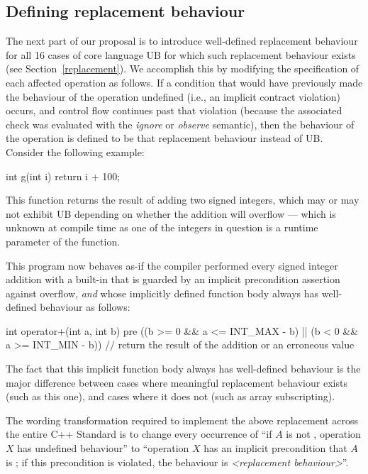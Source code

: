 \subsection{Defining replacement behaviour}
\label{specifyeb}
The next part of our proposal is to introduce well-defined replacement behaviour for all 16 cases of core language UB for which such replacement behaviour exists (see Section~\ref{replacement}). We accomplish this by modifying the specification of each affected operation as follows. If a condition that would have previously made the behaviour of the operation undefined (i.e., an implicit contract violation) occurs, and control flow continues past that violation (because the associated check was evaluated with the \emph{ignore} or \emph{observe} semantic), then the behaviour of the operation is defined to be that replacement behaviour instead of UB. Consider the following example:
\begin{codeblock}
int g(int i) {
  return i + 100;
}
\end{codeblock}
This function returns the result of adding two signed integers, which may or may not exhibit UB depending on whether the addition will overflow --- which is unknown at compile time as one of the integers in question is a runtime parameter of the function.

This program now behaves as-if the compiler performed every signed integer addition with a built-in  that is guarded by an implicit precondition assertion against overflow, \emph{and} whose implicitly defined function body always has well-defined behaviour as follows:
\begin{codeblock}
int operator+(int a, int b)
pre ((b >= 0 && a <= INT_MAX - b) || (b < 0 && a >= INT_MIN - b)) {  
  // return the result of the addition or an erroneous value
}
\end{codeblock}
The fact that this implicit function body always has well-defined behaviour is the major difference between cases where meaningful replacement behaviour exists (such as this one), and cases where it does not (such as array subscripting).

The wording transformation required to implement the above replacement across the entire C++ Standard is to change every occurrence of “if $A$ is not , operation $X$ has undefined behaviour'' to ``operation $X$ has an implicit precondition that $A$ is ; if this precondition is violated, the behaviour is \emph{<replacement behaviour>}''.

